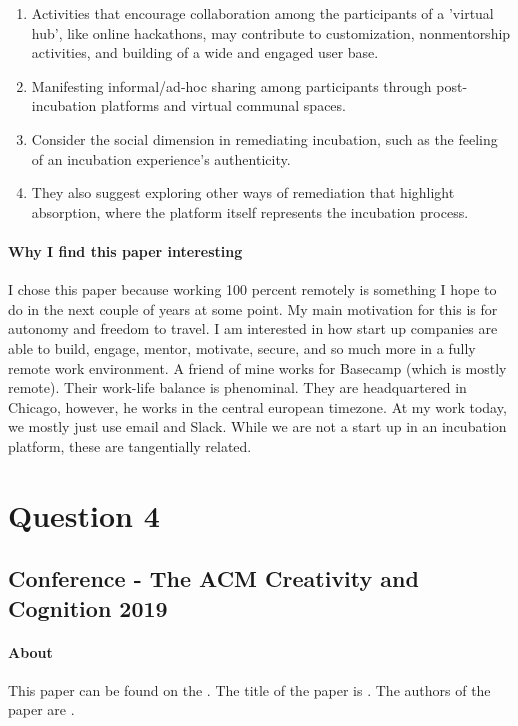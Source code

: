 \begin{enumerate}
\item
  Activities that encourage collaboration among the participants of a 'virtual hub', like online hackathons, may contribute to customization, nonmentorship activities, and building of a wide and engaged user base.
\item
  Manifesting informal/ad-hoc sharing among participants through post-incubation platforms and virtual communal spaces.
\item
  Consider the social dimension in remediating incubation, such as the feeling of an incubation experience's authenticity.
\item
  They also suggest exploring other ways of remediation that highlight absorption, where the platform itself represents the incubation process.
\end{enumerate}

\paragraph{Why I find this paper interesting}
I chose this paper because working 100 percent remotely is something I hope to do in the next couple of years at some point. My main motivation for this is for autonomy and freedom to travel. I am interested in how start up companies are able to build, engage, mentor, motivate, secure, and so much more in a fully remote work environment. A friend of mine works for Basecamp (which is mostly remote). Their work-life balance is phenominal. They are headquartered in Chicago, however, he works in the central european timezone. At my work today, we mostly just use email and Slack. While we are not a start up in an incubation platform, these are tangentially related.

\section{Question 4}

\subsection{Conference - The ACM Creativity and Cognition 2019}

\paragraph{About}
This paper can be found on the . The title of the paper is . The authors of the paper are .

